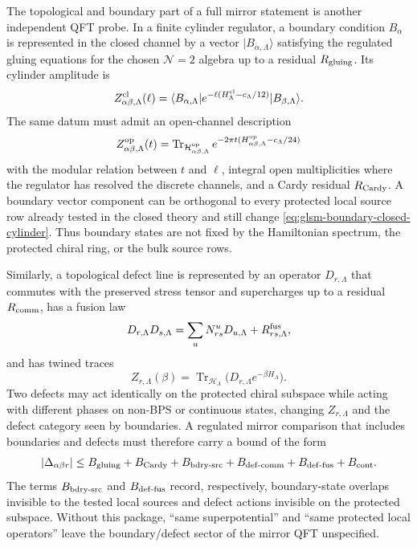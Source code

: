 \begin{remark}
\label{rem:glsm-mirror-boundary-defect-obligation}
The topological and boundary part of a full mirror statement is another
independent QFT probe.  In a finite cylinder regulator, a boundary condition
\(B_\alpha\) is represented in the closed channel by a vector
\(|B_{\alpha,\Lambda}\rangle\) satisfying the regulated gluing equations for the
chosen \(\mathcal N=2\) algebra up to a residual \(R_{\rm gluing}\).  Its
cylinder amplitude is
\begin{equation}
  Z^{\rm cl}_{\alpha\beta,\Lambda}(\ell)
  =
  \langle B_{\alpha,\Lambda}|
  e^{-\ell(H^{\rm cl}_\Lambda-c_\Lambda/12)}
  |B_{\beta,\Lambda}\rangle .
  \label{eq:glsm-boundary-closed-cylinder}
\end{equation}
The same datum must admit an open-channel description
\begin{equation}
  Z^{\rm op}_{\alpha\beta,\Lambda}(t)
  =
  \operatorname{Tr}_{\mathcal H^{\rm op}_{\alpha\beta,\Lambda}}
  e^{-2\pi t(H^{\rm op}_{\alpha\beta,\Lambda}-c_\Lambda/24)}
  \label{eq:glsm-boundary-open-cylinder}
\end{equation}
with the modular relation between \(t\) and \(\ell\), integral open
multiplicities where the regulator has resolved the discrete channels, and a
Cardy residual \(R_{\rm Cardy}\).  A boundary vector component can be orthogonal
to every protected local source row already tested in the closed theory and
still change \eqref{eq:glsm-boundary-closed-cylinder}.  Thus boundary states
are not fixed by the Hamiltonian spectrum, the protected chiral ring, or the
bulk source rows.

Similarly, a topological defect line is represented by an operator
\(D_{r,\Lambda}\) that commutes with the preserved stress tensor and
supercharges up to a residual \(R_{\rm comm}\), has a fusion law
\[
  D_{r,\Lambda}D_{s,\Lambda}
  =
  \sum_u N_{rs}^{u}D_{u,\Lambda}+R^{\rm fus}_{rs,\Lambda},
\]
and has twined traces
\[
  Z_{r,\Lambda}(\beta)
  =
  \operatorname{Tr}_{\mathcal H_\Lambda}
  \bigl(D_{r,\Lambda}e^{-\beta H_\Lambda}\bigr).
\]
Two defects may act identically on the protected chiral subspace while acting
with different phases on non-BPS or continuous states, changing
\(Z_{r,\Lambda}\) and the defect category seen by boundaries.  A regulated
mirror comparison that includes boundaries and defects must therefore carry a
bound of the form
\[
  |\Delta_{\alpha\beta r}|
  \le
  B_{\rm gluing}
  +B_{\rm Cardy}
  +B_{\rm bdry\text{-}src}
  +B_{\rm def\text{-}comm}
  +B_{\rm def\text{-}fus}
  +B_{\rm cont}.
\]
The terms \(B_{\rm bdry\text{-}src}\) and \(B_{\rm def\text{-}fus}\) record,
respectively, boundary-state overlaps invisible to the tested local sources and
defect actions invisible on the protected subspace.  Without this package,
``same superpotential'' and ``same protected local operators'' leave the
boundary/defect sector of the mirror QFT unspecified.
\end{remark}

